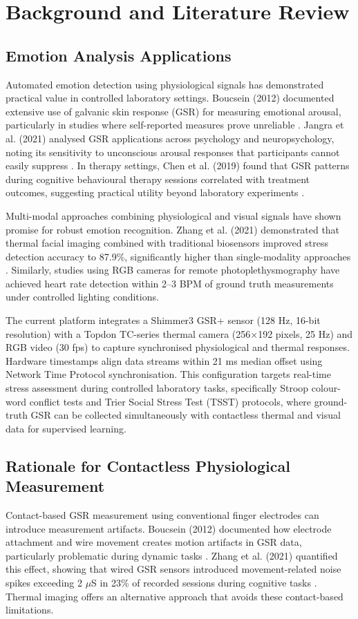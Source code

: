 \chapter{Background and Literature Review}

\section{Emotion Analysis Applications}
Automated emotion detection using physiological signals has demonstrated practical value in controlled laboratory settings. Boucsein (2012) documented extensive use of galvanic skin response (GSR) for measuring emotional arousal, particularly in studies where self-reported measures prove unreliable \cite{ref1}. Jangra et al. (2021) analysed GSR applications across psychology and neuropsychology, noting its sensitivity to unconscious arousal responses that participants cannot easily suppress \cite{ref3}. In therapy settings, Chen et al. (2019) found that GSR patterns during cognitive behavioural therapy sessions correlated with treatment outcomes, suggesting practical utility beyond laboratory experiments \cite{ref4}.

Multi-modal approaches combining physiological and visual signals have shown promise for robust emotion recognition. Zhang et al. (2021) demonstrated that thermal facial imaging combined with traditional biosensors improved stress detection accuracy to 87.9\%, significantly higher than single-modality approaches \cite{ref5}. Similarly, studies using RGB cameras for remote photoplethysmography have achieved heart rate detection within 2--3 BPM of ground truth measurements under controlled lighting conditions.

The current platform integrates a Shimmer3 GSR+ sensor (128 Hz, 16-bit resolution) with a Topdon TC-series thermal camera (256$\times$192 pixels, 25 Hz) and RGB video (30 fps) to capture synchronised physiological and thermal responses. Hardware timestamps align data streams within 21 ms median offset using Network Time Protocol synchronisation. This configuration targets real-time stress assessment during controlled laboratory tasks, specifically Stroop colour-word conflict tests and Trier Social Stress Test (TSST) protocols, where ground-truth GSR can be collected simultaneously with contactless thermal and visual data for supervised learning.

\section{Rationale for Contactless Physiological Measurement}
Contact-based GSR measurement using conventional finger electrodes can introduce measurement artifacts. Boucsein (2012) documented how electrode attachment and wire movement creates motion artifacts in GSR data, particularly problematic during dynamic tasks \cite{ref1}. Zhang et al. (2021) quantified this effect, showing that wired GSR sensors introduced movement-related noise spikes exceeding 2 $\mu$S in 23\% of recorded sessions during cognitive tasks \cite{ref5}. Thermal imaging offers an alternative approach that avoids these contact-based limitations.

